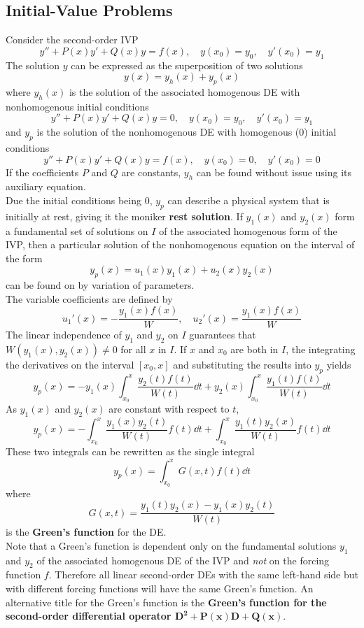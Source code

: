 \documentclass[./Differential Equations]{subfiles}
\begin{document}
		\subsection{Initial-Value Problems}
				Consider the second-order IVP
					\[y'' + P(x)y' + Q(x)y = f(x), \quad y(x_0) = y_0, \quad y'(x_0) = y_1\]
					The solution \(y\) can be expressed as the superposition of two solutions
					\[y(x) = y_h(x) + y_p(x)\]
					where \(y_h(x)\) is the solution of the associated homogenous DE with nonhomogenous initial conditions
					\[y'' + P(x)y' + Q(x)y = 0, \quad y(x_0) = y_0, \quad y'(x_0) = y_1\]
					and \(y_p\) is the solution of the nonhomogenous DE with homogenous (0) initial conditions
					\[y'' + P(x)y' + Q(x)y = f(x), \quad y(x_0) = 0, \quad y'(x_0) = 0\]
					If the coefficients \(P\) and \(Q\) are constants, \(y_h\) can be found without issue using its auxiliary equation. \\
					Due the initial conditions being 0, \(y_p\) can describe a physical system that is initially at rest, giving it the moniker \textbf{rest solution}.
				If \(y_1(x)\) and \(y_2(x)\) form a fundamental set of solutions on \(I\) of the associated homogenous form of the IVP, then a particular solution of the nonhomogenous equation on the interval of the form
					\[y_p(x) = u_1(x)y_1(x) + u_2(x)y_2(x)\]
					can be found on by variation of parameters. \\
					The variable coefficients are defined by
					\[
						u_1'(x) = -\frac{y_1(x)f(x)}{W}, \quad u_2'(x) = \frac{y_1(x)f(x)}{W}
					\]
					The linear independence of \(y_1\) and \(y_2\) on \(I\) guarantees that \(W(y_1(x), y_2(x)) \ne 0\) for all \(x\) in \(I\). If \(x\) and \(x_0\) are both in \(I\), the integrating the derivatives on the interval \([x_0, x]\) and substituting the results into \(y_p\) yields
					\[y_p(x) = -y_1(x)\int_{x_0}^x\frac{y_2(t)f(t)}{W(t)}\dd{t} + y_2(x)\int_{x_0}^x\frac{y_1(t)f(t)}{W(t)}\dd{t}\]
					As \(y_1(x)\) and \(y_2(x)\) are constant with respect to \(t\),
					\[y_p(x) = -\int_{x_0}^x\frac{y_1(x)y_2(t)}{W(t)}f(t)\dd{t} + \int_{x_0}^x\frac{y_1(t)y_2(x)}{W(t)}f(t)\dd{t}\]
					These two integrals can be rewritten as the single integral
					\[y_p(x) = \int_{x_0}^x G(x, t)f(t)\dd{t}\]
					where
					\[G(x, t) = \frac{y_1(t)y_2(x) - y_1(x)y_2(t)}{W(t)}\]
					is the \textbf{Green's function} for the DE. \\
				Note that a Green's function is dependent only on the fundamental solutions \(y_1\) and \(y_2\) of the associated homogenous DE of the IVP and \textit{not} on the forcing function \(f\). Therefore all linear second-order DEs with the same left-hand side but with different forcing functions will have the same Green's function. An alternative title for the Green's function is the \textbf{Green's function for the second-order differential operator \(\bm{D^2 + P(x)D + Q(x)}\)}.
\end{document}
